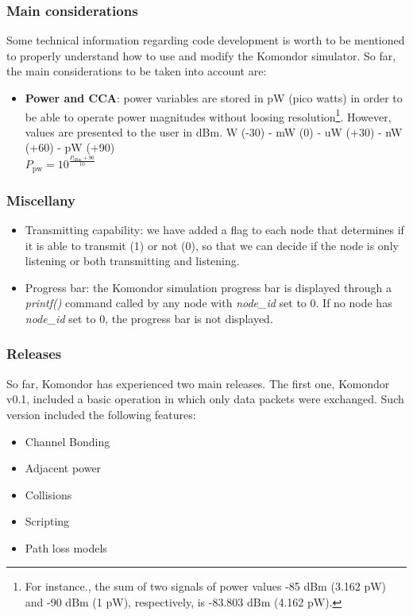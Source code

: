 \documentclass[a4paper]{article}
\begin{document}
		\subsubsection{Main considerations}
		\label{section:development_considerations}
		Some technical information regarding code development is worth to be mentioned to properly understand how to use and modify the Komondor simulator. So far, the main considerations to be taken into account are:		
		\begin{itemize}
		\item \textbf{Power and CCA}: power variables are stored in pW (pico watts) in order to be able to operate power magnitudes without loosing resolution\footnote{For instance., the sum of two signals of power values -85 dBm (3.162 pW) and -90 dBm (1 pW), respectively, is -83.803 dBm (4.162 pW).}. However, values are presented to the user in dBm.		
		W (-30)  - mW (0)  - uW (+30) - nW (+60) - pW (+90)\\
		$P_{\text{pw}} = 10^{\frac{P_{\text{dBm}} + 90}{10}}$
		\end{itemize}
	
		\subsubsection{Miscellany}
		\label{section:development_miscellany}
			\begin{itemize}
			\item Transmitting capability: we have added a flag to each node that determines if it is able to transmit (1) or not (0), so that we can decide if the node is only listening or both transmitting and listening.
			\item Progress bar: the Komondor simulation progress bar is displayed through a \textit{printf()} command called by any node with \textit{node\_id} set to 0. If no node has \textit{node\_id} set to 0, the progress bar is not displayed.
			\end{itemize}
	
		\subsubsection{Releases}
		\label{section:development_releases}
		So far, Komondor has experienced two main releases. The first one, Komondor v0.1, included a basic operation in which only data packets were exchanged. Such version included the following features:
		\begin{itemize}
			\item Channel Bonding
			\item Adjacent power
			\item Collisions
			\item Scripting
			\item Path loss models
		\end{itemize}
	
\end{document}
